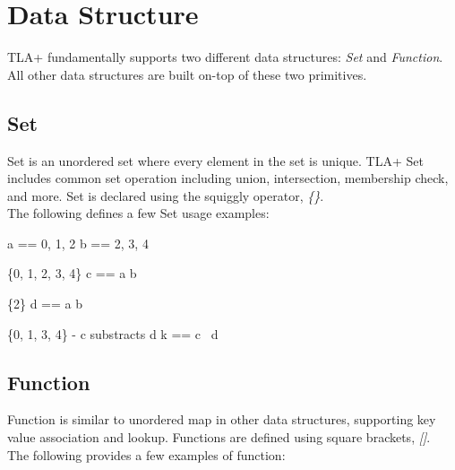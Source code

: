
% 

\chapter{Data Structure}

TLA+ fundamentally supports two different data structures: \textit{Set} and
\textit{Function}. All other data structures are built on-top of these two
primitives.

\section{Set}

Set is an unordered set where every element in the set is unique. TLA+ Set
includes common set operation including union, intersection, membership check,
and more. Set is declared using the squiggly operator, \textit{\{\}}.\\

The following defines a few Set usage examples:\\

\begin{tla}
a == {0, 1, 2}
b == {2, 3, 4}

\* \{0, 1, 2, 3, 4\}
c == a \union b         

\* \{2\}
d == a \intersect b     

\* \{0, 1, 3, 4\} - c substracts d
k == c \ d             
\end{tla}
\begin{tlatex}
%
%
\@pvspace{8.0pt}%
\@x{}%
%
\@xx{}%
%
\@pvspace{8.0pt}%
\@x{}%
%
\@xx{}%
%
\@pvspace{8.0pt}%
\@x{}%
%
\@xx{}%
%
\end{tlatex}

\section{Function}

Function is similar to unordered map in other data structures, supporting key
value association and lookup. Functions are defined using square brackets,
\textit{[]}.\\

The following provides a few examples of function:\\

